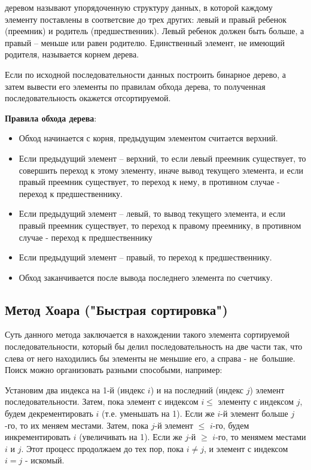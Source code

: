 \documentclass[a4paper,11pt]{article}
\begin{document}
  { деревом} называют упорядоченную структуру данных, в которой каждому элементу поставлены в соответсвие до трех других: левый и  правый ребенок (преемник) и родитель (пред\-шественник).
Левый ребенок должен быть больше, а правый -- меньше или равен родителю. Единственный элемент, не имеющий родителя, называется корнем дерева.
 
  Если по исходной последовательности данных построить бинарное дерево, а затем вывести его элементы по правилам обхода дерева, то  полученная последовательность окажется отсортируемой.

  {\bf Правила обхода дерева}:
\begin{itemize}
    \item Обход начинается с корня, предыдущим  элементом считается верхний.
    \item Если предыдущий элемент -- верхний, то если левый преемник существует, то совершить переход к этому элементу, иначе вывод текущего элемента, и если правый преемник существует, то переход к нему, в противном случае - переход к предшественнику.
    \item Если предыдущий элемент -- левый, то вывод текущего элемента, и если правый преемник существует, то переход к правому преемнику, в противном случае - переход к предшественнику
    \item Если предыдущий элемент -- правый, то переход к предшественнику.
    \item Обход заканчивается  после вывода последнего элемента по счетчику.
\end{itemize}

\begin{center}
  \subsection{  Метод Хоара ("Быстрая сортировка")}
\end{center}

    Суть данного метода заключается в нахождении такого элемента сортируемой последова\-тельности, который бы делил
последовательность на две части так, что слева от него находились бы элементы не меньшие его, а справа - не\ 
 большие. Поиск можно организовать разными способыми, например: 

Установим два индекса на 1-й (индекс $i$) и на последний (индекс $j$) элемент последова\-тельности. Затем,
пока элемент с индексом $i \le$ элементу с индексом $j$, будем декремен\-тировать $i$ (т.е. уменьшать на 1). 
Если же $i$-й элемент больше $j$-го, то их  меняем местами. Затем, пока $j$-й элемент $\le$ $i$-го, будем 
инкрементировать $i$ (увеличивать на 1). Если же $j$-й $\ge$ $i$-го, то менямем местами $i$ и $j$. Этот процесс
продолжаем до тех пор, пока $i \ne j$, и элемент с индексом $i = j $ - искомый. 
\end{document}
